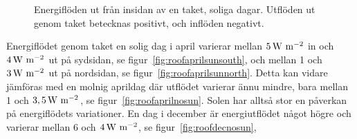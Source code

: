 \begin{figure}[hpbt]
\centering
{}

\caption{\label{fig:rooffigurescloud}Energiflöden ut från insidan av en taket, soliga dagar. Utflöden ut genom taket betecknas positivt, och inflöden negativt.}
\end{figure}

Energiflödet genom taket en solig dag i april varierar mellan $\unit[5]{W~m^{-2}}$ in och $\unit[4]{W~m^{-2}}$ ut på sydsidan, se figur~\ref{fig:roofaprilsunsouth}, och mellan 1 och $\unit[3]{W~m^{-2}}$ ut på nordsidan, se figur~\ref{fig:roofaprilsunnorth}. Detta kan vidare jämföras med en molnig aprildag där utflödet varierar ännu mindre, bara mellan 1 och $\unit[3,5]{W~m^{-2}}$, se figur~\ref{fig:roofaprilnosun}. Solen har alltså stor en påverkan på energiflödets variationer. En dag i december är energiutflödet något högre och varierar mellan 6 och $\unit[4]{W~m^{-2}}$, se figur~\ref{fig:roofdecnosun},


